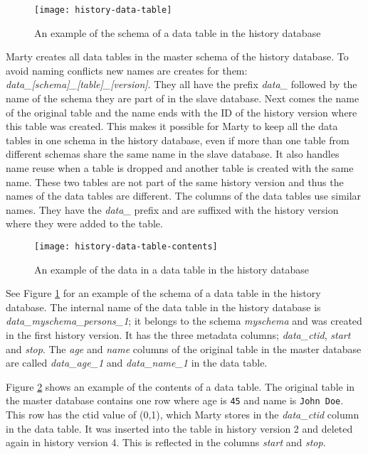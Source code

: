 \begin{figure}[h!]
  \centering
    \texttt{[image: history-data-table]}
  \caption{An example of the schema of a data table in the history database}
  \label{fig:history-data-table-2}
\end{figure}

Marty creates all data tables in the master schema of the history database.
To avoid naming conflicts new names are creates for them: \textit{data\_[schema]\_[table]\_[version]}.
They all have the prefix \textit{data\_} followed by the name of the schema they are part of in the slave database.
Next comes the name of the original table and the name ends with the ID of the history version where this table was created.
This makes it possible for Marty to keep all the data tables in one schema in the history database, even if more than one table from different schemas share the same name in the slave database.
It also handles name reuse when a table is dropped and another table is created with the same name.
These two tables are not part of the same history version and thus the names of the data tables are different.
The columns of the data tables use similar names.
They have the \textit{data\_} prefix and are suffixed with the history version where they were added to the table.

\begin{figure}[h]
  \centering
    \texttt{[image: history-data-table-contents]}
  \caption{An example of the data in a data table in the history database}
  \label{fig:history-data-table-contents}
\end{figure}

See Figure \ref{fig:history-data-table-2} for an example of the schema of a data table in the history database.
The internal name of the data table in the history database is \textit{data\_myschema\_persons\_1}; it belongs to the schema \textit{myschema} and was created in the first history version.
It has the three metadata columns; \textit{data\_ctid}, \textit{start} and \textit{stop}.
The \textit{age} and \textit{name} columns of the original table in the master database are called \textit{data\_age\_1} and \textit{data\_name\_1} in the data table.

Figure \ref{fig:history-data-table-contents} shows an example of the contents of a data table.
The original table in the master database contains one row where age is \texttt{45} and name is \texttt{John Doe}.
This row has the ctid value of (0,1), which Marty stores in the \textit{data\_ctid} column in the data table.
It was inserted into the table in history version 2 and deleted again in history version 4.
This is reflected in the columns \textit{start} and \textit{stop}.